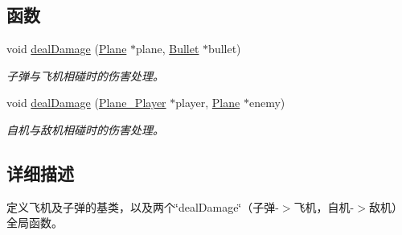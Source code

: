 \subsection*{函数}
\begin{DoxyCompactItemize}
\item 
\mbox{\label{_plane_01-_01_bullet_8h_a62df33be634d89b2428bc84d98761bb7}} 
void \hyperlink{_plane_01-_01_bullet_8h_a62df33be634d89b2428bc84d98761bb7}{deal\+Damage} (\hyperlink{class_plane}{Plane} $\ast$plane, \hyperlink{class_bullet}{Bullet} $\ast$bullet)
\begin{DoxyCompactList}\small\item\em 子弹与飞机相碰时的伤害处理。 \end{DoxyCompactList}\item 
\mbox{\label{_plane_01-_01_bullet_8h_ab0e76936bbaa057d4f15ddf206b75b91}} 
void \hyperlink{_plane_01-_01_bullet_8h_ab0e76936bbaa057d4f15ddf206b75b91}{deal\+Damage} (\hyperlink{class_plane___player}{Plane\+\_\+\+Player} $\ast$player, \hyperlink{class_plane}{Plane} $\ast$enemy)
\begin{DoxyCompactList}\small\item\em 自机与敌机相碰时的伤害处理。 \end{DoxyCompactList}\end{DoxyCompactItemize}


\subsection{详细描述}
定义飞机及子弹的基类，以及两个\char`\"{}deal\+Damage\char`\"{}（子弹-\/$>$飞机，自机-\/$>$敌机）全局函数。 

